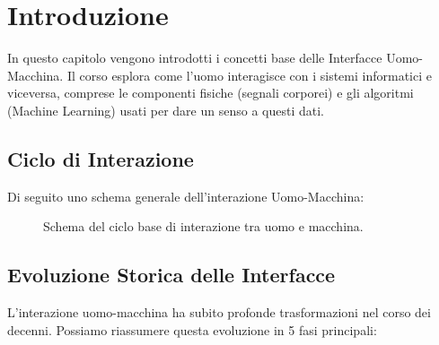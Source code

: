 \chapter{Introduzione}

In questo capitolo vengono introdotti i concetti base delle Interfacce Uomo-Macchina. Il corso esplora come l'uomo interagisce con i sistemi informatici e viceversa, comprese le componenti fisiche (segnali corporei) e gli algoritmi (Machine Learning) usati per dare un senso a questi dati.

\section{Ciclo di Interazione}

Di seguito uno schema generale dell'interazione Uomo-Macchina:

\begin{figure}[h!]
    \centering
    \caption{Schema del ciclo base di interazione tra uomo e macchina.}
\end{figure}

\section{Evoluzione Storica delle Interfacce}
L'interazione uomo-macchina ha subito profonde trasformazioni nel corso dei decenni. Possiamo riassumere questa evoluzione in 5 fasi principali:


